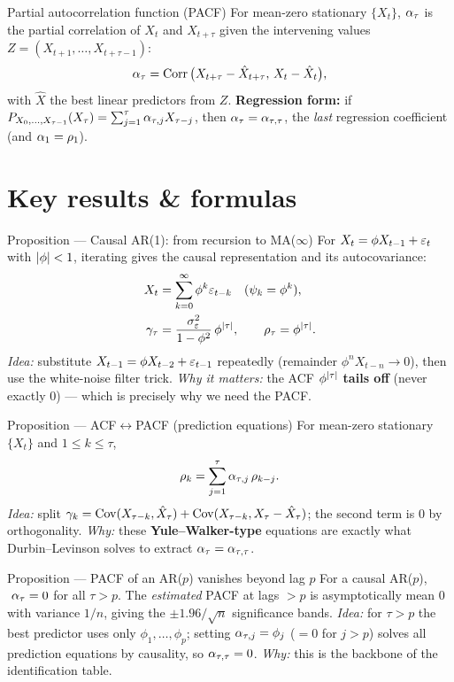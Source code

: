 \documentclass[11pt]{article}
\begin{document}
\begin{defn}{Partial autocorrelation function (PACF)}
For mean-zero stationary $\{X_t\}$, $\alpha_\tau$ is the partial correlation of $X_t$ and $X_{t+\tau}$ given the intervening values $Z=(X_{t+1},\dots,X_{t+\tau-1})$:
\[
\alpha_\tau=\operatorname{Corr}\big(X_{t+\tau}-\hat X_{t+\tau},\,X_t-\hat X_t\big),
\]
with $\hat X$ the best linear predictors from $Z$. \textbf{Regression form:} if $P_{X_0,\dots,X_{\tau-1}}(X_\tau)=\sum_{j=1}^{\tau}\alpha_{\tau,j}X_{\tau-j}$, then $\alpha_\tau=\alpha_{\tau,\tau}$, the \emph{last} regression coefficient (and $\alpha_1=\rho_1$).
\end{defn}

\section*{Key results \& formulas}

\begin{result}{Proposition --- Causal AR(1): from recursion to MA($\infty$)}
For $X_t=\phi X_{t-1}+\varepsilon_t$ with $\left\lvert \phi \right\rvert<1$, iterating gives the causal representation and its autocovariance:
\[
\begin{aligned}
X_t&=\sum_{k=0}^{\infty}\phi^{k}\varepsilon_{t-k}\quad(\psi_k=\phi^k),\\
\gamma_\tau&=\frac{\sigma_\varepsilon^2}{1-\phi^2}\,\phi^{\left\lvert \tau \right\rvert},\qquad \rho_\tau=\phi^{\left\lvert \tau \right\rvert}.
\end{aligned}
\]
\textit{Idea:} substitute $X_{t-1}=\phi X_{t-2}+\varepsilon_{t-1}$ repeatedly (remainder $\phi^nX_{t-n}\to0$), then use the white-noise filter trick. \textit{Why it matters:} the ACF $\phi^{\left\lvert \tau \right\rvert}$ \textbf{tails off} (never exactly $0$) --- which is precisely why we need the PACF.
\end{result}

\begin{result}{Proposition --- ACF$\leftrightarrow$PACF (prediction equations)}
For mean-zero stationary $\{X_t\}$ and $1\le k\le\tau$,
\[
\rho_k=\sum_{j=1}^{\tau}\alpha_{\tau,j}\,\rho_{k-j}.
\]
\textit{Idea:} split $\gamma_k=\operatorname{Cov}(X_{\tau-k},\hat X_\tau)+\operatorname{Cov}(X_{\tau-k},X_\tau-\hat X_\tau)$; the second term is $0$ by orthogonality. \textit{Why:} these \textbf{Yule--Walker-type} equations are exactly what Durbin--Levinson solves to extract $\alpha_\tau=\alpha_{\tau,\tau}$.
\end{result}

\begin{result}{Proposition --- PACF of an AR($p$) vanishes beyond lag $p$}
For a causal AR($p$), $\ \alpha_\tau=0$ for all $\tau>p$. The \emph{estimated} PACF at lags $>p$ is asymptotically mean $0$ with variance $1/n$, giving the $\pm1.96/\sqrt n$ significance bands. \textit{Idea:} for $\tau>p$ the best predictor uses only $\phi_1,\dots,\phi_p$; setting $\alpha_{\tau,j}=\phi_j$ ($=0$ for $j>p$) solves all prediction equations by causality, so $\alpha_{\tau,\tau}=0$. \textit{Why:} this is the backbone of the identification table.
\end{result}
\end{document}
